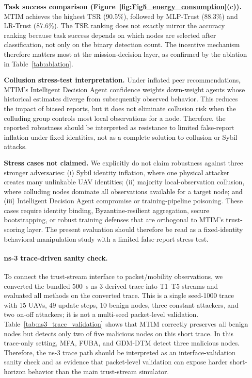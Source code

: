 \documentclass[notspecified,article,submit,moreauthors]{Definitions/mdpi}
\begin{document}
\textbf{Task success comparison (Figure~\ref{fig:Fig5_energy_consumption}(c)).}
MTIM achieves the highest TSR (90.5\%), followed by MLP-Trust (88.3\%) and LR-Trust (87.6\%). The TSR ranking does not exactly mirror the accuracy ranking because task success depends on which nodes are selected after classification, not only on the binary detection count. The incentive mechanism therefore matters most at the mission-decision layer, as confirmed by the ablation in Table~\ref{tab:ablation}.\par

\textbf{Collusion stress-test interpretation.}
Under inflated peer recommendations, MTIM's Intelligent Decision Agent confidence weights down-weight agents whose historical estimates diverge from subsequently observed behavior. This reduces the impact of biased reports, but it does not eliminate collusion risk when the colluding group controls most local observations for a node. Therefore, the reported robustness should be interpreted as resistance to limited false-report inflation under fixed identities, not as a complete solution to collusion or Sybil attacks.

\textbf{Stress cases not claimed.}
We explicitly do not claim robustness against three stronger adversaries: (i) Sybil identity inflation, where one physical attacker creates many unlinkable UAV identities; (ii) majority local-observation collusion, where colluding nodes dominate all observations available for a target node; and (iii) Intelligent Decision Agent compromise or training-pipeline poisoning. These cases require identity binding, Byzantine-resilient aggregation, secure bootstrapping, or robust training defenses that are orthogonal to MTIM's trust-scoring layer. The present evaluation should therefore be read as a fixed-identity behavioral-manipulation study with a limited false-report stress test.

\paragraph{ns-3 trace-driven sanity check.}
To connect the trust-stream interface to packet/mobility observations, we converted the bundled 500~s ns-3-derived trace into T1--T5 streams and evaluated all methods on the converted trace. This is a single seed-1000 trace with 15 UAVs, 49 update steps, 10 benign nodes, three constant attackers, and two on-off attackers; it is not a multi-seed packet-level validation. Table~\ref{tab:ns3_trace_validation} shows that MTIM correctly preserves all benign nodes but detects only two of five malicious nodes on this short trace. In this trace-only setting, MFA, FUBA, and GDM-DTM detect three malicious nodes. Therefore, the ns-3 trace path should be interpreted as an interface-validation sanity check and as evidence that packet-level validation can expose harder short-horizon behavior than the main trust-stream simulator.
\end{document}
